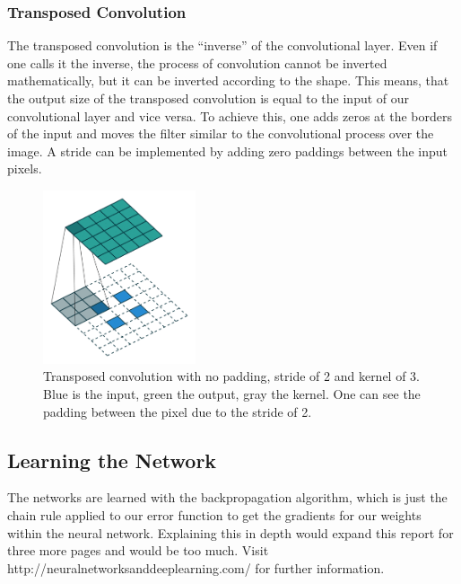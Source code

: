 \documentclass[
     11pt,         %
     a4paper,      %
     oneside,
     ]{article}
\begin{document}
\subsubsection{Transposed Convolution}
The transposed convolution is the \enquote{inverse} of the convolutional layer. Even if one calls it the inverse, the process of convolution cannot be inverted mathematically, but it can be inverted according to the shape.
This means, that the output size of the transposed convolution is equal to the input of our convolutional layer and vice versa. To achieve this, one adds zeros at the borders of the input and moves the filter similar to the convolutional process over the image. A stride can be implemented by adding zero paddings between the input pixels.\cite{transposed1}\cite{transposed2}
\begin{figure}[H]
  \begin{center}
    \includegraphics[width=0.4\textwidth]{images/tConv.png}
    \caption{Transposed convolution with no padding, stride of 2 and kernel of 3. Blue is the input, green the output, gray the kernel. One can see the padding between the pixel due to the stride of 2.\cite{TConv1}}
    \label{fig:tConv}
  \end{center}
\end{figure}

\subsection{Learning the Network}
The networks are learned with the backpropagation algorithm, which is just the chain rule applied to our error function to get the gradients for our weights within the neural network. Explaining this in depth would expand this report for three more pages and would be too much. Visit http://neuralnetworksanddeeplearning.com/ \cite{neuralnetworksanddeeplearning} for further information.
\end{document}
